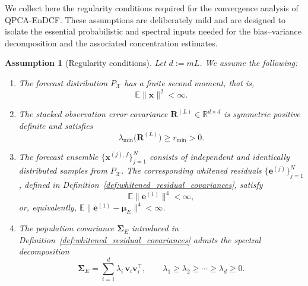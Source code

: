 \documentclass[11pt,a4paper]{article}
\newtheorem{assumption}{Assumption}
\begin{document}
We collect here the regularity conditions required for the convergence analysis of QPCA-EnDCF. These assumptions are deliberately mild and are designed to isolate the essential probabilistic and spectral inputs needed for the bias--variance decomposition and the associated concentration estimates.

\begin{assumption}[Regularity conditions]
\label{ass:regularity_bias_variance}
Let $d:=mL$. We assume the following:
\begin{enumerate}[label=(\roman*)]
\item The forecast distribution $P_{\mathcal{X}}$ has a finite second moment, that is,
\begin{equation}
\mathbb{E}\|\mathbf{x}\|^{2}<\infty .
\end{equation}

\item The stacked observation error covariance $\mathbf{R}^{(L)}\in\mathbb{R}^{d\times d}$ is symmetric positive definite and satisfies
\begin{equation}
\lambda_{\min}\!\bigl(\mathbf{R}^{(L)}\bigr)\ge r_{\min}>0.
\end{equation}

\item The forecast ensemble $\{\mathbf{x}^{(j),f}\}_{j=1}^N$ consists of independent and identically distributed samples from $P_{\mathcal{X}}$. The corresponding whitened residuals $\{\mathbf{e}^{(j)}\}_{j=1}^N$, defined in Definition~\ref{def:whitened_residual_covariances}, satisfy
\begin{equation}
\mathbb{E}\|\mathbf{e}^{(1)}\|^{4}<\infty,
\end{equation}
or, equivalently, $\mathbb{E}\|\mathbf{e}^{(1)}-\boldsymbol{\mu}_E\|^{4}<\infty$.

\item The population covariance $\boldsymbol{\Sigma}_E$ introduced in Definition~\ref{def:whitened_residual_covariances} admits the spectral decomposition
\begin{equation}
\boldsymbol{\Sigma}_E=\sum_{i=1}^{d}\lambda_i\,\mathbf{v}_i\mathbf{v}_i^\top,
\qquad
\lambda_1\ge\lambda_2\ge\cdots\ge\lambda_d\ge 0.
\end{equation}
\end{enumerate}
\end{assumption}
\end{document}

